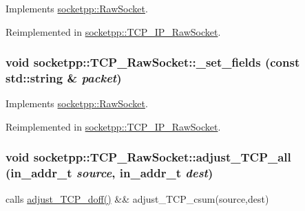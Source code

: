 Implements \hyperlink{classsocketpp_1_1RawSocket_eb0a3f716c0fc46efa4123acf0fe1e66}{socketpp::RawSocket}.

Reimplemented in \hyperlink{classsocketpp_1_1TCP__IP__RawSocket_281508237add8a3c530bb0be0b6a1e7b}{socketpp::TCP\_\-IP\_\-RawSocket}.\hypertarget{classsocketpp_1_1TCP__RawSocket_6976a4726503eef03a8d446afdbaddbe}{
\subsubsection[{\_\-set\_\-fields}]{\setlength{\rightskip}{0pt plus 5cm}void socketpp::TCP\_\-RawSocket::\_\-set\_\-fields (const std::string \& {\em packet})}}
\label{classsocketpp_1_1TCP__RawSocket_6976a4726503eef03a8d446afdbaddbe}




Implements \hyperlink{classsocketpp_1_1RawSocket_45e6b041703cb8ae0f93dd19766865d5}{socketpp::RawSocket}.

Reimplemented in \hyperlink{classsocketpp_1_1TCP__IP__RawSocket_f8f606ce33835813cc5c3a530e181432}{socketpp::TCP\_\-IP\_\-RawSocket}.\hypertarget{classsocketpp_1_1TCP__RawSocket_0a1017145ae76253dfca51cbd672fae7}{
\subsubsection[{adjust\_\-TCP\_\-all}]{\setlength{\rightskip}{0pt plus 5cm}void socketpp::TCP\_\-RawSocket::adjust\_\-TCP\_\-all (in\_\-addr\_\-t {\em source}, \/  in\_\-addr\_\-t {\em dest})}}
\label{classsocketpp_1_1TCP__RawSocket_0a1017145ae76253dfca51cbd672fae7}


calls \hyperlink{classsocketpp_1_1TCP__RawSocket_029eb8bfbf19531253edf046775d9f5f}{adjust\_\-TCP\_\-doff()} \&\& adjust\_\-TCP\_\-csum(source,dest) 

